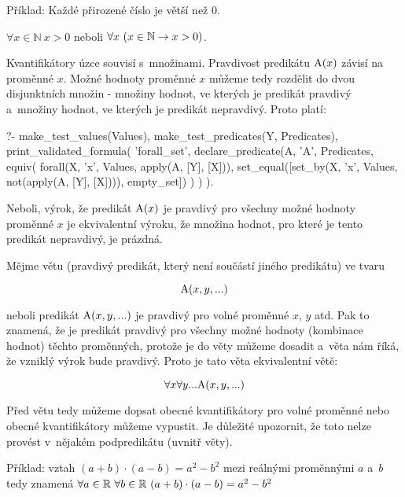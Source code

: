 Příklad: Každé přirozené číslo je větší než 0. 

\(\forall x \in \mathbb{N} \ x > 0\) neboli \(\forall x \ (x \in \mathbb{N} \rightarrow x > 0)\).

Kvantifikátory úzce souvisí s~množinami. Pravdivost predikátu \(\mathrm{A}(x)\) závisí na proměnné \(x\). Možné hodnoty
proměnné \(x\) můžeme tedy rozdělit do dvou disjunktních množin - množiny hodnot, ve kterých je predikát pravdivý a~množiny hodnot, ve kterých je predikát nepravdivý. Proto platí:

\begin{prolog}
?- 	make_test_values(Values),
	make_test_predicates(Y, Predicates),
	print_validated_formula(
		'forall_set',
		declare_predicate(A, 'A', Predicates,
			equiv(
				forall(X, 'x', Values, apply(A, [Y], [X])),
				set_equal([set_by(X, 'x', Values, not(apply(A, [Y], [X]))), empty_set])
			)
		)
	).
\end{prolog}

Neboli, výrok, že predikát \(\mathrm{A}(x)\) je pravdivý pro všechny možné hodnoty proměnné \(x\) je ekvivalentní výroku, že množina hodnot, pro které je tento predikát nepravdivý, je prázdná.

Mějme větu (pravdivý predikát, který není součástí jiného predikátu) ve tvaru

\begin{equation}
\mathrm{A}(x, y, ...)
\end{equation}

neboli predikát \(\mathrm{A}(x, y, ...)\) je pravdivý pro volné proměnné \(x\), \(y\) atd. Pak to znamená,
že je predikát pravdivý pro všechny možné hodnoty (kombinace hodnot) těchto proměnných, protože je do věty můžeme dosadit a~věta nám říká, že vzniklý výrok bude pravdivý. Proto je tato věta ekvivalentní větě:

\begin{equation}
\forall x \forall y ... \mathrm{A}(x, y, ...)
\end{equation}

Před větu tedy můžeme dopsat obecné kvantifikátory pro volné proměnné nebo  obecné kvantifikátory můžeme vypustit. Je důležité upozornit, že toto nelze provést v~nějakém podpredikátu (uvnitř věty).

Příklad: vztah \((a + b) \cdot (a - b) = a^2 - b^2\) mezi reálnými proměnnými \(a\) a~\(b\) tedy znamená \(\forall a \in \mathbb{R} \ \forall b \in \mathbb{R} \ (a + b) \cdot (a - b) = a^2 - b^2\)

